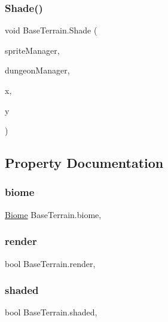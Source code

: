 \subsubsection{\texorpdfstring{Shade()}{Shade()}}
{\footnotesize\ttfamily void Base\+Terrain.\+Shade (\begin{DoxyParamCaption}\item[{\mbox{\hyperlink{class_sprite_manager}{Sprite\+Manager}}}]{sprite\+Manager,  }\item[{\mbox{\hyperlink{class_dungeon_manager}{Dungeon\+Manager}}}]{dungeon\+Manager,  }\item[{int}]{x,  }\item[{int}]{y }\end{DoxyParamCaption})}



\subsection{Property Documentation}
\mbox{\label{class_base_terrain_a89f7a3d77182f51a257cf1f503bb6fe9}} 
\subsubsection{\texorpdfstring{biome}{biome}}
{\footnotesize\ttfamily \mbox{\hyperlink{class_biome}{Biome}} Base\+Terrain.\+biome\hspace{0.3cm}{\ttfamily [get]}, {\ttfamily [set]}}

\mbox{\label{class_base_terrain_a845e9830b7282650856b64db83d7633b}} 
\subsubsection{\texorpdfstring{render}{render}}
{\footnotesize\ttfamily bool Base\+Terrain.\+render\hspace{0.3cm}{\ttfamily [get]}, {\ttfamily [set]}}

\mbox{\label{class_base_terrain_a5c1d125049a42d2b25ef2e09166bbd91}} 
\subsubsection{\texorpdfstring{shaded}{shaded}}
{\footnotesize\ttfamily bool Base\+Terrain.\+shaded\hspace{0.3cm}{\ttfamily [get]}, {\ttfamily [set]}}

